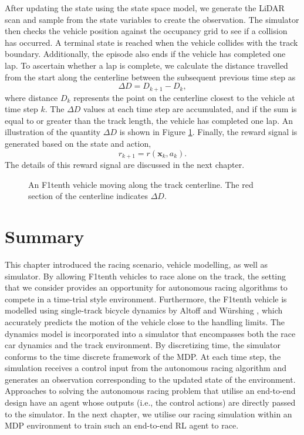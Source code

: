 After updating the state using the state space model, we generate the LiDAR scan and sample from the state variables to create the observation.
The simulator then checks the vehicle position against the occupancy grid to see if a collision has occurred.
A terminal state is reached when the vehicle collides with the track boundary.
Additionally, the episode also ends if the vehicle has completed one lap.
To ascertain whether a lap is complete, we calculate the distance travelled from the start along the centerline between the subsequent previous time step as
\begin{equation}
    \Delta D = D_{k+1} - D_{k},
\end{equation}
where distance $D_k$ represents the point on the centerline closest to the vehicle at time step $k$.
The $\Delta D$ values at each time step are accumulated, and if the sum is equal to or greater than the track length, the vehicle has completed one lap.
An illustration of the quantity $\Delta D$ is shown in Figure \ref{fig:centerline_distance}.
Finally, the reward signal is generated based on the state and action,
\begin{equation}
    r_{k+1} = r(\mathbf{x}_k, a_k).
\end{equation}
The details of this reward signal are discussed in the next chapter.
\begin{figure}[htb!]
    \centering
    
    \caption[A vehicle moving along the track centerline]{An F1tenth vehicle moving along the track centerline. The red section of the centerline indicates $\Delta D$.}
    \label{fig:centerline_distance}
\end{figure}


\section{Summary}

This chapter introduced the racing scenario, vehicle modelling, as well as simulator.
By allowing F1tenth vehicles to race alone on the track, the setting that we consider provides an opportunity for autonomous racing algorithms to compete in a time-trial style environment.
Furthermore, the F1tenth vehicle is modelled using single-track bicycle dynamics by Altoff and  W\"{u}rshing \cite{Althoff2020}, which accurately predicts the motion of the vehicle close to the handling limits.
The dynamics model is incorporated into a simulator that encompasses both the race car dynamics and the track environment. 
By discretizing time, the simulator conforms to the time discrete framework of the MDP. 
At each time step, the simulation receives a control input from the autonomous racing algorithm and generates an observation corresponding to the updated state of the environment. 
Approaches to solving the autonomous racing problem that utilise an end-to-end design have an agent whose outputs (i.e., the control actions) are directly passed to the simulator.
In the next chapter, we utilise our racing simulation within an MDP environment to train such an end-to-end RL agent to race.